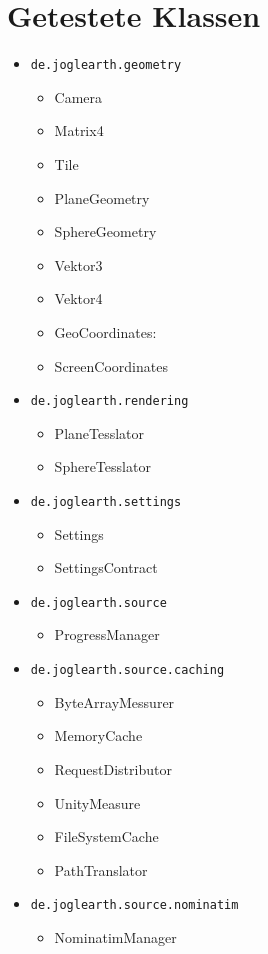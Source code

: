\documentclass[10pt]{scrreprt}
\begin{document}
\section{Getestete Klassen}
\begin{itemize}
\item \texttt{de.joglearth.geometry}
 \begin{itemize}
 \item Camera
 \item Matrix4
 \item Tile
 \item PlaneGeometry
 \item SphereGeometry
 \item Vektor3
 \item Vektor4
 \item GeoCoordinates:
 \item ScreenCoordinates
 \end{itemize}
\item \texttt{de.joglearth.rendering}
 \begin{itemize}
 \item PlaneTesslator
 \item SphereTesslator
 \end{itemize}
 \item \texttt{de.joglearth.settings}
 \begin{itemize}
 \item Settings
 \item SettingsContract
 \end{itemize}
 \item \texttt{de.joglearth.source}
 \begin{itemize}
 \item ProgressManager
 \end{itemize}
 \item \texttt{de.joglearth.source.caching}
 \begin{itemize}
 \item ByteArrayMessurer
 \item MemoryCache
 \item RequestDistributor
 \item UnityMeasure
 \item FileSystemCache
 \item PathTranslator
 \end{itemize}
 \item \texttt{de.joglearth.source.nominatim}
 \begin{itemize}
 \item NominatimManager

\end{itemize}
\end{itemize}
\end{document}
